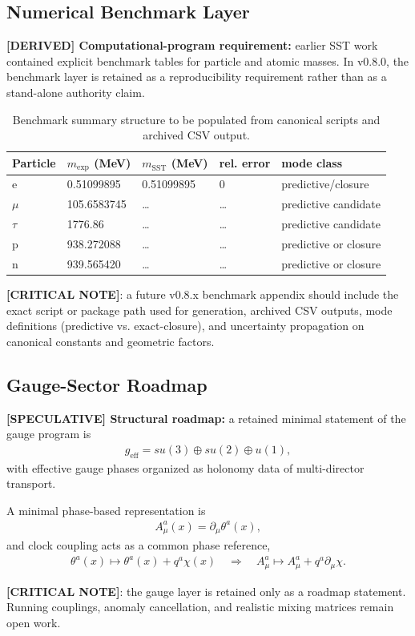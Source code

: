 \documentclass[11pt]{article}
\begin{document}
\subsection{Numerical Benchmark Layer}
\textbf{[DERIVED] Computational-program requirement:} earlier SST work contained explicit benchmark tables for particle and atomic masses. In v0.8.0, the benchmark layer is retained as a reproducibility requirement rather than as a stand-alone authority claim.

\begin{table}[h]
\centering
\begin{tabular}{lllll}
\hline
Particle & $m_{\mathrm{exp}}$ (MeV) & $m_{\mathrm{SST}}$ (MeV) & rel. error & mode class \\
\hline
e & 0.51099895 & 0.51099895 & 0 & predictive/closure \\
$\mu$ & 105.6583745 & \dots & \dots & predictive candidate \\
$\tau$ & 1776.86 & \dots & \dots & predictive candidate \\
p & 938.272088 & \dots & \dots & predictive or closure \\
n & 939.565420 & \dots & \dots & predictive or closure \\
\hline
\end{tabular}
\caption{Benchmark summary structure to be populated from canonical scripts and archived CSV output.}
\end{table}

\textbf{[CRITICAL NOTE]}: a future v0.8.x benchmark appendix should include the exact script or package path used for generation, archived CSV outputs, mode definitions (predictive vs. exact-closure), and uncertainty propagation on canonical constants and geometric factors.

\subsection{Gauge-Sector Roadmap}
\textbf{[SPECULATIVE] Structural roadmap:} a retained minimal statement of the gauge program is
\begin{align}
    g_{\mathrm{eff}} = su(3) \oplus su(2) \oplus u(1),
\end{align}
with effective gauge phases organized as holonomy data of multi-director transport.

A minimal phase-based representation is
\begin{align}
    A^a_{\mu}(x) = \partial_{\mu}\theta^a(x),
\end{align}
and clock coupling acts as a common phase reference,
\begin{align}
    \theta^a(x) \mapsto \theta^a(x)+q^a\chi(x)
    \quad\Rightarrow\quad
    A^a_{\mu}\mapsto A^a_{\mu}+q^a\partial_{\mu}\chi.
\end{align}

\textbf{[CRITICAL NOTE]}: the gauge layer is retained only as a roadmap statement. Running couplings, anomaly cancellation, and realistic mixing matrices remain open work.
\end{document}
